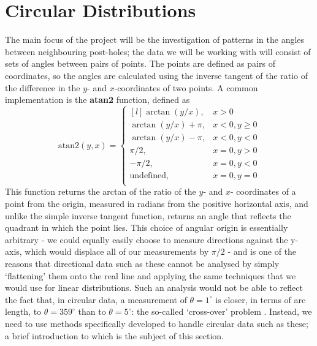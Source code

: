 \documentclass[../../ArchStats.tex]{subfiles}
\begin{document}


\nocite{Jammalamadaka2001}


\section{Circular Distributions}
\label{sec:circular-distributions}

The main focus of the project will be the investigation of patterns in the angles between neighbouring post-holes; the data we will be working with will consist of sets of angles between pairs of points. The points are defined as pairs of coordinates, so the angles are calculated using the inverse tangent of the ratio of the difference in the $y$- and $x$-coordinates of two points. A common implementation is the \textbf{atan2} function, defined as
\begin{equation}
\label{eqn:atan2}
\text{atan2} (y, x) = \left\lbrace \begin{matrix*}[l]
\arctan(y/x), & x > 0 \\
\arctan(y/x) + \pi, & x < 0, y \geq 0 \\
\arctan(y/x) - \pi, & x < 0, y < 0 \\
\pi/2, & x = 0, y > 0 \\
-\pi/2, & x = 0, y < 0 \\
\text{undefined}, & x = 0, y = 0 \\
\end{matrix*} \right. 
\end{equation}
This function returns the arctan of the ratio of the $y$- and $x$- coordinates of a point from the origin, measured in radians from the positive horizontal axis, and unlike the simple inverse tangent function, returns an angle that reflects the quadrant in which the point lies. This choice of angular origin is essentially arbitrary - we could equally easily choose to measure directions against the y-axis, which would displace all of our measurements by $\pi/2$ - and is one of the reasons that directional  data such as these cannot be analysed by simply `flattening' them onto the real line and applying the same techniques that we would use for linear distributions. Such an analysis would not be able to reflect the fact that, in circular data, a measurement of $\theta = 1^\circ$ is closer, in terms of arc length, to $\theta = 359^\circ$ than to $\theta = 5^\circ$: the so-called `cross-over' problem \cite{Fisher1993}. Instead, we need to use methods specifically developed to handle circular data such as these; a brief introduction to which is the subject of this section. 
\end{document}
